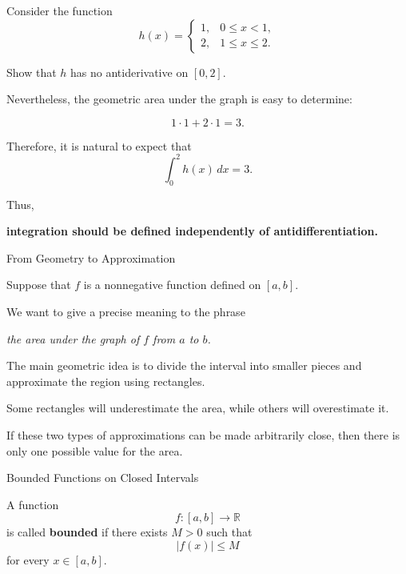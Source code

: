 \documentclass[12pt,a4paper]{article}
\begin{document}
Consider the function
\[
h(x)=
\begin{cases}
1, & 0\le x<1,\\
2, & 1\le x\le 2.
\end{cases}
\]

\begin{problem}
Show that $h$ has no antiderivative on $[0,2]$.
\end{problem}

\vfill

Nevertheless, the geometric area under the graph is easy to determine:

\[
1\cdot 1+2\cdot 1=3.
\]

Therefore, it is natural to expect that
\[
\int_0^2 h(x)\,dx=3.
\]

Thus,

\begin{center}
\textbf{integration should be defined independently of
antidifferentiation.}
\end{center}

\clearpage

\begin{heading}
From Geometry to Approximation
\end{heading}

Suppose that $f$ is a nonnegative function defined on $[a,b]$.

We want to give a precise meaning to the phrase

\begin{center}
\emph{the area under the graph of $f$ from $a$ to $b$.}
\end{center}

The main geometric idea is to divide the interval into smaller pieces
and approximate the region using rectangles.

Some rectangles will underestimate the area, while others will
overestimate it.

If these two types of approximations can be made arbitrarily close,
then there is only one possible value for the area.


\clearpage

\begin{heading}
Bounded Functions on Closed Intervals
\end{heading}

\begin{definition}
A function
\[
f:[a,b]\to\mathbb{R}
\]
is called \textbf{bounded} if there exists $M>0$ such that
\[
|f(x)|\le M
\]
for every $x\in[a,b]$.
\end{definition}
\end{document}
